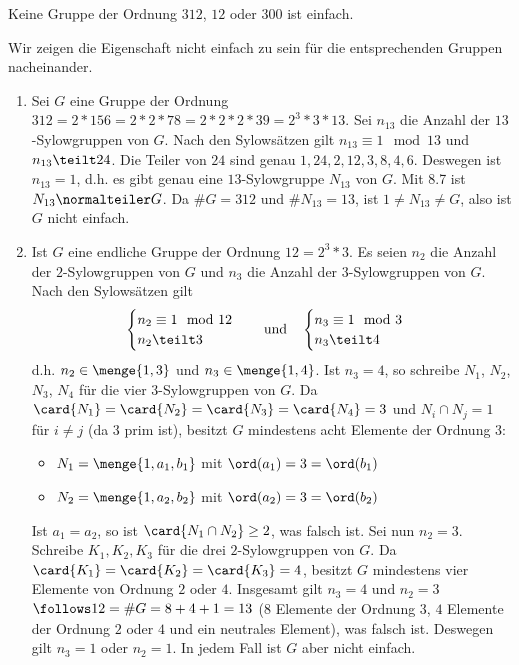 \begin{uebungsblatt}
	\begin{uebung}
		Keine Gruppe der Ordnung $312$, $12$ oder $300$ ist einfach.
	\end{uebung}
	\begin{loesung}
		Wir zeigen die Eigenschaft nicht einfach zu sein für die entsprechenden Gruppen nacheinander.
		\begin{enumerate}[label=(\arabic*)]
			\item Sei $G$ eine Gruppe der Ordnung $312 = 2 * 156 = 2*2*78 = 2*2*2*39 = 2^3*3*13$. Sei $n_{13}$ die Anzahl der $13$-Sylowgruppen von $G$. Nach den Sylowsätzen gilt $n_{13} \equiv 1 \mod 13$ und $n_{13} \teilt 24$. Die Teiler von $24$ sind genau $1,24,2,12,3,8,4,6$. Deswegen ist $n_{13} = 1$, d.h. es gibt genau eine $13$-Sylowgruppe $N_{13}$ von $G$. Mit 8.7 ist $N_{13} \normalteiler G$. Da $\# G = 312$ und $\# N_{13} = 13$, ist $1 \neq N_{13} \neq G$, also ist $G$ nicht einfach.
			\item Ist $G$ eine endliche Gruppe der Ordnung $12 =2^3 * 3$. Es seien $n_2$ die Anzahl der $2$-Sylowgruppen von $G$ und $n_3$ die Anzahl der $3$-Sylowgruppen von $G$. Nach den Sylowsätzen gilt
			\begin{align*}
			\begin{cases}
			n_2 \equiv 1 \mod 12 \\ n_2 \teilt 3
			\end{cases} 
			\quad \text{und} \quad
			\begin{cases}
			n_3 \equiv 1 \mod 3 \\ n_3 \teilt 4
			\end{cases}
			\end{align*}
			d.h. $n_2 \in \menge{1,3}$ und $n_3 \in \menge{1,4}$. Ist $n_3 = 4$, so schreibe $N_1$, $N_2$, $N_3$, $N_4$ für die vier $3$-Sylowgruppen von $G$. Da $\card{N_1} = \card{N_2} = \card{N_3} = \card{N_4} = 3$ und $N_i \cap N_j = 1$ für $i \neq j$ (da $3$ prim ist), besitzt $G$ mindestens acht Elemente der Ordnung $3$:
			\begin{itemize}[label=$-$]
				\item $N_1 = \menge{1, a_1, b_1}$ mit $\ord(a_1) = 3 = \ord(b_1)$
				\item $N_2 = \menge{1, a_2, b_2}$ mit $\ord(a_2) = 3 = \ord(b_2)$
			\end{itemize}
			Ist $a_1 = a_2$, so ist $\card{N_1 \cap N_2} \geq 2$, was falsch ist. Sei nun $n_2 = 3$. Schreibe $K_1, K_2, K_3$ für die drei $2$-Sylowgruppen von $G$. Da $\card{K_1} = \card{K_2} = \card{K_3} = 4$, besitzt $G$ mindestens vier Elemente von Ordnung $2$ oder $4$. Insgesamt gilt $n_3 = 4$ und $n_2 = 3$ $\follows 12 = \# G = 8+4+1 = 13$ ($8$ Elemente der Ordnung $3$, $4$ Elemente der Ordnung $2$ oder $4$ und ein neutrales Element), was falsch ist. Deswegen gilt $n_3 = 1$ oder $n_2 = 1$. In jedem Fall ist $G$ aber nicht einfach.

\end{enumerate}
\end{loesung}
\end{uebungsblatt}
